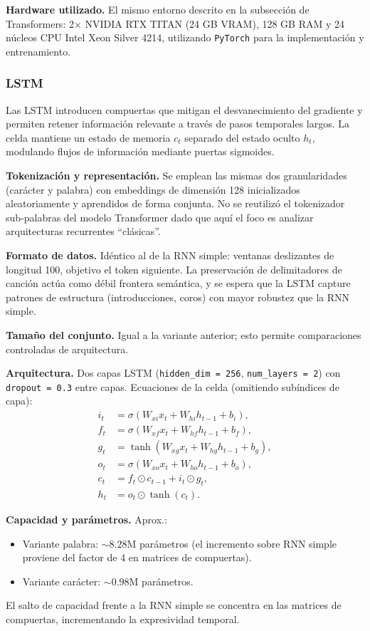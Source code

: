 \documentclass[paper=letter, fontsize=11pt, draft=false]{scrartcl}
\numberwithin{equation}{section} %
\numberwithin{figure}{section} %
\numberwithin{table}{section} %
\numberwithin{subsection}{section}
\begin{document}
	\textbf{Hardware utilizado.} El mismo entorno descrito en la subsección de Transformers: 2× NVIDIA RTX TITAN (24 GB VRAM), 128 GB RAM y 24 núcleos CPU Intel Xeon Silver 4214, utilizando \texttt{PyTorch} para la implementación y entrenamiento.



\subsubsection{LSTM}
Las LSTM introducen compuertas que mitigan el desvanecimiento del gradiente y permiten retener información relevante a través de pasos temporales largos. La celda mantiene un estado de memoria $c_t$ separado del estado oculto $h_t$, modulando flujos de información mediante puertas sigmoides.

	\textbf{Tokenización y representación.} Se emplean las mismas dos granularidades (carácter y palabra) con embeddings de dimensión 128 inicializados aleatoriamente y aprendidos de forma conjunta. No se reutilizó el tokenizador sub‐palabras del modelo Transformer dado que aquí el foco es analizar arquitecturas recurrentes “clásicas”.

	\textbf{Formato de datos.} Idéntico al de la RNN simple: ventanas deslizantes de longitud 100, objetivo el token siguiente. La preservación de delimitadores de canción actúa como débil frontera semántica, y se espera que la LSTM capture patrones de estructura (introducciones, coros) con mayor robustez que la RNN simple.

	\textbf{Tamaño del conjunto.} Igual a la variante anterior; esto permite comparaciones controladas de arquitectura.

	\textbf{Arquitectura.} Dos capas LSTM (\texttt{hidden\_dim = 256}, \texttt{num\_layers = 2}) con \texttt{dropout = 0.3} entre capas. Ecuaciones de la celda (omitiendo subíndices de capa):
\[
\begin{aligned}
i_t &= \sigma(W_{xi} x_t + W_{hi} h_{t-1} + b_i),\\
f_t &= \sigma(W_{xf} x_t + W_{hf} h_{t-1} + b_f),\\
g_t &= \tanh(W_{xg} x_t + W_{hg} h_{t-1} + b_g),\\
o_t &= \sigma(W_{xo} x_t + W_{ho} h_{t-1} + b_o),\\
c_t &= f_t \odot c_{t-1} + i_t \odot g_t,\\
h_t &= o_t \odot \tanh(c_t).
\end{aligned}
\]

\textbf{Capacidad y parámetros.} Aprox.:
\begin{itemize}
    \item Variante palabra: $\sim 8.28$M parámetros (el incremento sobre RNN simple proviene del factor de 4 en matrices de compuertas).
    \item Variante carácter: $\sim 0.98$M parámetros.
\end{itemize}
El salto de capacidad frente a la RNN simple se concentra en las matrices de compuertas, incrementando la expresividad temporal.
\end{document}
